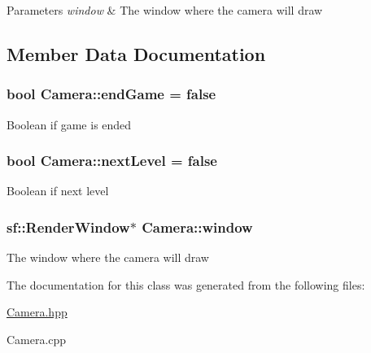 \begin{DoxyParams}{Parameters}
{\em window} & The window where the camera will draw \\
\hline
\end{DoxyParams}


\subsection{Member Data Documentation}
\hypertarget{class_camera_a9a52cd3423a98df63e8bc98e88f441f5}{}
\subsubsection[{end\+Game}]{\setlength{\rightskip}{0pt plus 5cm}bool Camera\+::end\+Game = false}\label{class_camera_a9a52cd3423a98df63e8bc98e88f441f5}
Boolean if game is ended \hypertarget{class_camera_a1f10d515adcdde3a5e8b075d86693aab}{}
\subsubsection[{next\+Level}]{\setlength{\rightskip}{0pt plus 5cm}bool Camera\+::next\+Level = false}\label{class_camera_a1f10d515adcdde3a5e8b075d86693aab}
Boolean if next level \hypertarget{class_camera_aaea4f29f0bd925f8d8288b7b7dfb0d8d}{}
\subsubsection[{window}]{\setlength{\rightskip}{0pt plus 5cm}sf\+::\+Render\+Window$\ast$ Camera\+::window}\label{class_camera_aaea4f29f0bd925f8d8288b7b7dfb0d8d}
The window where the camera will draw 

The documentation for this class was generated from the following files\+:\begin{DoxyCompactItemize}
\item 
\hyperlink{_camera_8hpp}{Camera.\+hpp}\item 
Camera.\+cpp\end{DoxyCompactItemize}
